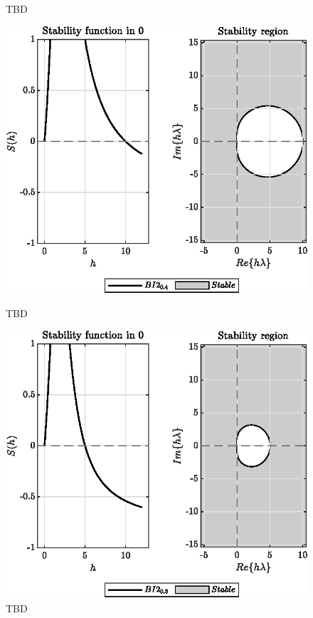 \documentclass[11pt,a4paper,oneside]{article}
\begin{document}
\begin{figure}[htb]
\begin{minipage}{0.45\textwidth}
        \caption[]{\label{fig:ex5_BI2-07} TBD}
    \end{minipage}
\end{figure}

\begin{figure}[htb]
    \centering
    \begin{minipage}{0.45\textwidth}
        \centering
        \includegraphics*[width=\textwidth, keepaspectratio]{ex5_BI2_0.4.eps}
        \caption[]{\label{fig:ex5_BI2-04} TBD}
    \end{minipage}
    \hspace{0.05\textwidth}
    \begin{minipage}{0.45\textwidth}
        \centering
        \includegraphics*[width=\textwidth, keepaspectratio]{ex5_BI2_0.3.eps}
        \caption[]{\label{fig:ex5_BI2-03} TBD}
    \end{minipage}
\end{figure}
\end{document}
